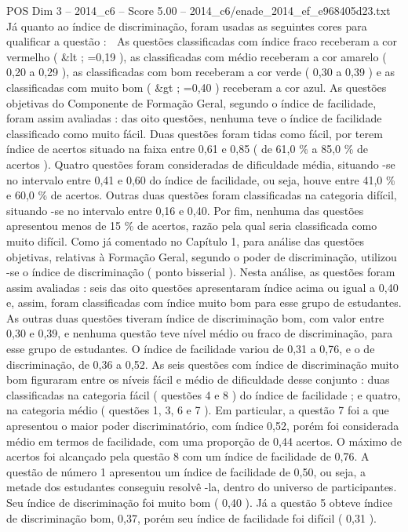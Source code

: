 \begin{textsample}{POS Dim 3 – 2014\_c6 – Score 5.00 – 2014\_c6/enade\_2014\_ef\_e968405d23.txt}
Já quanto ao índice de discriminação, foram usadas as seguintes cores para qualificar a questão :  As questões classificadas com índice fraco receberam a cor vermelho ( \&lt ; =0,19 ), as classificadas com médio receberam a cor amarelo ( 0,20 a 0,29 ), as classificadas com bom receberam a cor verde ( 0,30 a 0,39 ) e as classificadas com muito bom ( \&gt ; =0,40 ) receberam a cor azul.
As questões objetivas do Componente de Formação Geral, segundo o índice de facilidade, foram assim avaliadas : das oito questões, nenhuma teve o índice de facilidade classificado como muito fácil.
Duas questões foram tidas como fácil, por terem índice de acertos situado na faixa entre 0,61 e 0,85 ( de 61,0 \% a 85,0 \% de acertos ).
Quatro questões foram consideradas de dificuldade média, situando -se no intervalo entre 0,41 e 0,60 do índice de facilidade, ou seja, houve entre 41,0 \% e 60,0 \% de acertos.
Outras duas questões foram classificadas na categoria difícil, situando -se no intervalo entre 0,16 e 0,40.
Por fim, nenhuma das questões apresentou menos de 15 \% de acertos, razão pela qual seria classificada como muito difícil.
Como já comentado no Capítulo 1, para análise das questões objetivas, relativas à Formação Geral, segundo o poder de discriminação, utilizou -se o índice de discriminação ( ponto bisserial ).
Nesta análise, as questões foram assim avaliadas : seis das oito questões apresentaram índice acima ou igual a 0,40 e, assim, foram classificadas com índice muito bom para esse grupo de estudantes.
As outras duas questões tiveram índice de discriminação bom, com valor entre 0,30 e 0,39, e nenhuma questão teve nível médio ou fraco de discriminação, para esse grupo de estudantes.
O índice de facilidade variou de 0,31 a 0,76, e o de discriminação, de 0,36 a 0,52.
As seis questões com índice de discriminação muito bom figuraram entre os níveis fácil e médio de dificuldade desse conjunto : duas classificadas na categoria fácil ( questões 4 e 8 ) do índice de facilidade ; e quatro, na categoria médio ( questões 1, 3, 6 e 7 ).
Em particular, a questão 7 foi a que apresentou o maior poder discriminatório, com índice 0,52, porém foi considerada médio em termos de facilidade, com uma proporção de 0,44 acertos.
O máximo de acertos foi alcançado pela questão 8 com um índice de facilidade de 0,76.
A questão de número 1 apresentou um índice de facilidade de 0,50, ou seja, a metade dos estudantes conseguiu resolvê -la, dentro do universo de participantes.
Seu índice de discriminação foi muito bom ( 0,40 ).
Já a questão 5 obteve índice de discriminação bom, 0,37, porém seu índice de facilidade foi difícil ( 0,31 ).

\end{textsample}
